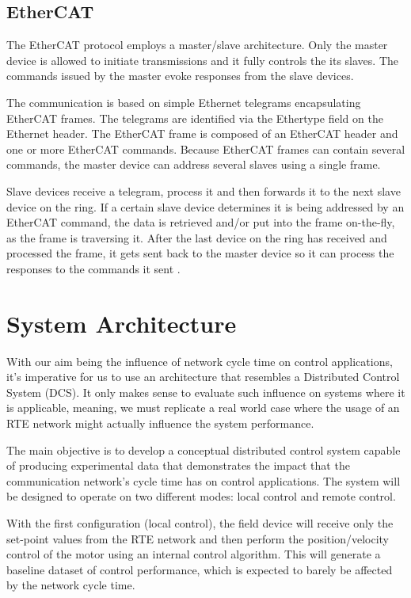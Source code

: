 \documentclass[a4paper]{IEEEtran}
\begin{document}
\subsection{EtherCAT}
The EtherCAT protocol employs a master/slave architecture.
Only the master device is allowed to initiate transmissions and it fully controls the its slaves.
The commands issued by the master evoke responses from the slave devices.

The communication is based on simple Ethernet telegrams encapsulating EtherCAT frames.
The telegrams are identified via the Ethertype field on the Ethernet header.
The EtherCAT frame is composed of an EtherCAT header and one or more EtherCAT commands.
Because EtherCAT frames can contain several commands, the master device can address several slaves using a single frame.

Slave devices receive a telegram, process it and then forwards it to the next slave device on the ring.
If a certain slave device determines it is being addressed by an EtherCAT command, the data is retrieved and/or put into the frame on-the-fly, as the frame is traversing it.
After the last device on the ring has received and processed the frame, it gets sent back to the master device so it can process the responses to the commands it sent \cite{technology:rte2}.

\section{System Architecture}
With our aim being the influence of network cycle time on control applications, it's imperative for us to use an architecture that resembles a Distributed Control System (DCS).
It only makes sense to evaluate such influence on systems where it is applicable, meaning, we must replicate a real world case where the usage of an RTE network might actually influence the system performance.

The main objective is to develop a conceptual distributed control system capable of producing experimental data that demonstrates the impact that the communication network's cycle time has on control applications.
The system will be designed to operate on two different modes: local control and remote control.

With the first configuration (local control), the field device will receive only the set-point values from the RTE network and then perform the position/velocity control of the motor using an internal control algorithm.
This will generate a baseline dataset of control performance, which is expected to barely be affected by the network cycle time.
\end{document}
